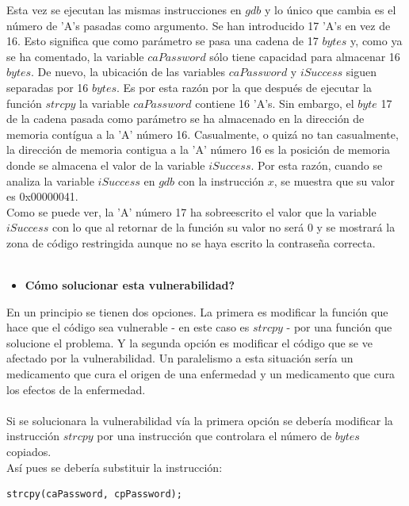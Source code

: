 \documentclass [titlepage, 12pt]{article}
\begin{document}
Esta vez se ejecutan las mismas instrucciones en $gdb$ y lo \'unico que cambia es el n\'umero de 'A's pasadas como argumento. Se han introducido 17 'A's en vez de 16. Esto significa que como par\'ametro se pasa una cadena de 17 $bytes$ y, como ya se ha comentado, la variable $caPassword$ s\'olo tiene capacidad para almacenar 16 $bytes$. De nuevo, la ubicaci\'on de las variables $caPassword$ y $iSuccess$ siguen separadas por 16 $bytes$. Es por esta raz\'on por la que despu\'es de ejecutar la funci\'on $strcpy$ la variable $caPassword$ contiene 16 'A's. Sin embargo, el $byte$ 17 de la cadena pasada como par\'ametro se ha almacenado en la direcci\'on de memoria cont\'igua a la 'A' n\'umero 16. Casualmente, o quiz\'a no tan casualmente, la direcci\'on de memoria contigua a la 'A' n\'umero 16 es la posici\'on de memoria donde se almacena el valor de la variable $iSuccess$. Por esta raz\'on, cuando se analiza la variable $iSuccess$ en $gdb$ con la instrucci\'on $x$, se muestra que su valor es 0x00000041. \\
Como se puede ver, la 'A' n\'umero 17 ha sobreescrito el valor que la variable $iSuccess$ con lo que al retornar de la funci\'on su valor no ser\'a 0 y se mostrar\'a la zona de c\'odigo restringida aunque no se haya escrito la contrase\~na correcta.\\
\\
\begin{itemize}
	\item \textbf{C\'omo solucionar esta vulnerabilidad?}
\end{itemize}

En un principio se tienen dos opciones. La primera es modificar la funci\'on que hace que el c\'odigo sea vulnerable - en este caso es $strcpy$ - por una funci\'on que solucione el problema. Y la segunda opci\'on es modificar el c\'odigo que se ve afectado por la vulnerabilidad. Un paralelismo a esta situaci\'on ser\'ia un medicamento que cura el origen de una enfermedad y un medicamento que cura los efectos de la enfermedad.\\
\\
Si se solucionara la vulnerabilidad v\'ia la primera opci\'on se deber\'ia modificar la instrucci\'on $strcpy$ por una instrucci\'on que controlara el n\'umero de $bytes$ copiados.\\
As\'i pues se deber\'ia substituir la instrucci\'on:

\lstset{language=C++,caption=C\'odigo vulnerable,label=fig:codigoVulnerable}
\begin{lstlisting}
strcpy(caPassword, cpPassword);
\end{lstlisting} 
\end{document}
